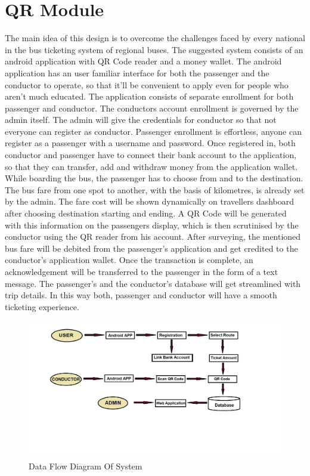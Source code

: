 
\section{QR Module }
The main idea of this design is to overcome the challenges faced by every national in the bus ticketing system of regional buses. The suggested system consists of an android application with QR Code reader and a money wallet. The android application has an user familiar interface for both the passenger and the conductor to operate, so that it'll be convenient to apply even for people who aren't much educated.
The application consists of separate enrollment for both passenger and conductor. The conductors account enrollment is governed by the admin itself. The admin will give the credentials for conductor so that not everyone can register as conductor. Passenger enrollment is effortless, anyone can register as a passenger with a username and password. Once registered in, both conductor and passenger have to connect their bank account to the application, so that they can transfer, add and withdraw money from the application wallet. While boarding the bus, the passenger has to choose from and to the destination. The bus fare from one spot to another, with the basis of kilometres, is already set by the admin. The fare cost will be shown dynamically on travellers dashboard after choosing destination starting and ending. A QR Code will be generated with this information on the passengers display, which is then scrutinised by the conductor using the QR reader from his account. After surveying, the mentioned bus fare will be debited from the passenger's application and get credited to the conductor’s application wallet. Once the transaction is complete, an acknowledgement will be transferred to the passenger in the form of a text message. The passenger’s and the conductor’s database will get streamlined with trip details. In this way both, passenger and conductor will have a smooth ticketing experience.


\begin{figure}
\centering
\includegraphics[width=1\textwidth]{Data FLow Diagram of System.jpg}
\caption{Data Flow Diagram Of System}
\end{figure}

